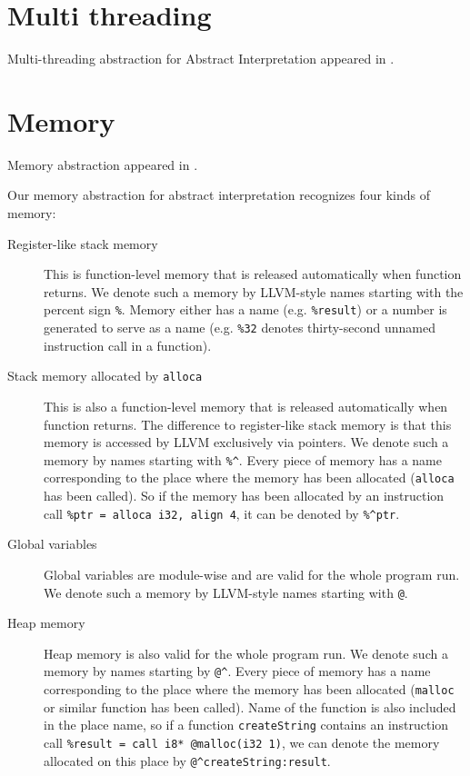 \documentclass[a4paper]{book}
\begin{document}
\section{Multi threading}
Multi-threading abstraction for Abstract Interpretation appeared in
\cite{M11}.

\section{Memory}
Memory abstraction appeared in \cite{M06}.

Our memory abstraction for abstract interpretation recognizes four
kinds of memory:
\begin{description}
\item[Register-like stack memory] This is function-level memory that
  is released automatically when function returns.  We denote such a
  memory by LLVM-style names starting with the percent sign
  \texttt{\%}.  Memory either has a name (e.g. \texttt{\%result}) or a
  number is generated to serve as a name (e.g. \texttt{\%32} denotes
  thirty-second unnamed instruction call in a function).
\item[Stack memory allocated by \texttt{alloca}] This is also a
  function-level memory that is released automatically when function
  returns.  The difference to register-like stack memory is that this
  memory is accessed by LLVM exclusively via pointers.  We denote such
  a memory by names starting with \texttt{\%\^}.  Every piece of
  memory has a name corresponding to the place where the memory has
  been allocated (\texttt{alloca} has been called).  So if the memory
  has been allocated by an instruction call \texttt{\%ptr = alloca
    i32, align 4}, it can be denoted by \texttt{\%\^{}ptr}.
\item[Global variables] Global variables are module-wise and are valid
  for the whole program run.  We denote such a memory by LLVM-style
  names starting with \texttt{@}.
\item[Heap memory] Heap memory is also valid for the whole program
  run.  We denote such a memory by names starting by \texttt{@\^}.
  Every piece of memory has a name corresponding to the place where
  the memory has been allocated (\texttt{malloc} or similar function
  has been called).  Name of the function is also included in the
  place name, so if a function \texttt{createString} contains an
  instruction call \texttt{\%result = call i8* @malloc(i32 1)}, we can
  denote the memory allocated on this place by
  \texttt{@\^{}createString:result}.
\end{description}
\end{document}
